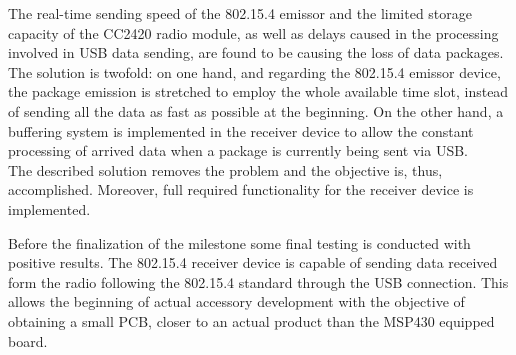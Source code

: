 \begin{enumerate}
			The real-time sending speed of the 802.15.4 emissor and the limited storage capacity of the CC2420 radio module, as well as delays caused in the processing involved in USB data sending, are found to be causing the loss of data packages. The solution is twofold: on one hand, and regarding the 802.15.4 emissor device, the package emission is stretched to employ the whole available time slot, instead of sending all the data as fast as possible at the beginning. On the other hand, a buffering system is implemented in the receiver device to allow the constant processing of arrived data when a package is currently being sent via USB.\\

			The described solution removes the problem and the objective is, thus, accomplished. Moreover, full required functionality for the receiver device is implemented.\\

			\end{enumerate}
	
		Before the finalization of the milestone some final testing is conducted with positive results. The 802.15.4 receiver device is capable of sending data received form the radio following the 802.15.4 standard through the USB connection. This allows the beginning of actual accessory development with the objective of obtaining a small PCB, closer to an actual product than the MSP430 equipped board.\\

